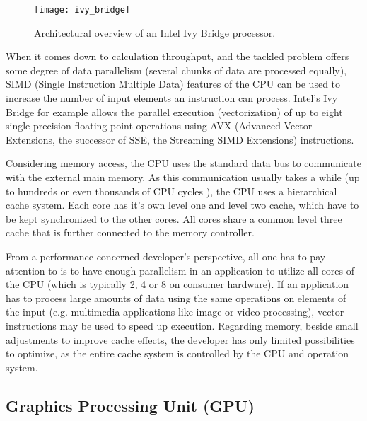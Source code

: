 \begin{figure}[h]
\centering
\texttt{[image: ivy\_bridge]}
\caption{Architectural overview of an Intel Ivy Bridge processor. \cite{ivy_bridge}}
\label{fig:ivy_bridge}
\end{figure}

When it comes down to calculation throughput, and the tackled problem offers some degree of data parallelism (several chunks of data are processed equally), SIMD (Single Instruction Multiple Data) features of the CPU can be used to increase the number of input elements an instruction can process. Intel's Ivy Bridge for example allows the parallel execution (vectorization) of up to eight single precision floating point operations using AVX (Advanced Vector Extensions, the  successor of SSE, the Streaming SIMD Extensions) instructions.

Considering memory access, the CPU uses the standard data bus to communicate with the external main memory. As this communication usually takes a while (up to hundreds or even thousands of CPU cycles \cite[p.54]{opencl_book}), the CPU uses a hierarchical cache system. Each core has it's own level one and level two cache, which have to be kept synchronized to the other cores. All cores share a common level three cache that is further connected to the memory controller.

From a performance concerned developer's perspective, all one has to pay attention to is to have enough parallelism in an application to utilize all cores of the CPU (which is typically 2, 4 or 8 on consumer hardware). If an application has to process large amounts of data using the same operations on elements of the input (e.g. multimedia applications like image or video processing), vector instructions may be used to speed up execution. Regarding memory, beside small adjustments to improve cache effects, the developer has only limited possibilities to optimize, as the entire cache system is controlled by the CPU and operation system. 


\subsection{Graphics Processing Unit (GPU)}
\label{sec:gpu}

